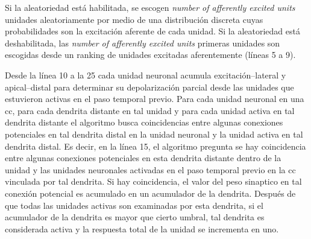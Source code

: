 {\begin{algorithm}
\begin{algorithmic}[1]
				\ENDIF
			\ENDFOR
			\ENDIF
		\ENDFOR
	\ENDFOR

\end{algorithmic}
\end{algorithm}

Si la aleatoriedad está habilitada, se escogen \emph{number of afferently excited units} unidades aleatoriamente por medio de una distribución discreta cuyas probabilidades son la excitación aferente de cada unidad. Si la aleatoriedad está deshabilitada, las \emph{number of afferently excited units} primeras unidades son escogidas desde un ranking de unidades excitadas aferentemente (líneas 5 a 9).

Desde la línea 10 a la 25 cada unidad neuronal acumula excitación--lateral y apical--distal para determinar su depolarización parcial desde las unidades que estuvieron activas en el paso temporal previo. Para cada unidad neuronal en una \gls{cc}, para cada dendrita distante en tal unidad y para cada unidad activa en tal dendrita distante el algoritmo busca coincidencias entre algunas conexiones potenciales en tal dendrita distal en la unidad neuronal y la unidad activa en tal dendrita distal.
Es decir, en la línea 15, el algoritmo pregunta se hay coincidencia entre algunas conexiones potenciales en esta dendrita distante dentro de la unidad y las unidades neuronales activadas en el paso temporal previo en la \gls{cc} vinculada por tal dendrita.
Si hay coincidencia, el valor del peso sinaptico en tal conexión potencial es acumulado en un acumulador de la dendrita.
Después de que todas las unidades activas son examinadas por esta dendrita, si el acumulador de la dendrita es mayor que cierto umbral, tal dendrita es considerada activa y la respuesta total de la unidad se incrementa en uno.

}

